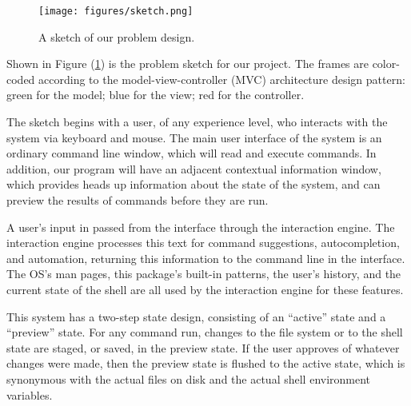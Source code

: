 \begin{figure}[h]
  \centering
  \texttt{[image: figures/sketch.png]}
  \caption{A sketch of our problem design.}
  \label{fig:sketch}
\end{figure}

Shown in Figure (\ref{fig:sketch}) is the problem sketch for our project. The
frames are color-coded according to the model-view-controller (MVC) architecture
design pattern: green for the model; blue for the view; red for the controller.

The sketch begins with a user, of any experience level, who interacts with the
system via keyboard and mouse. The main user interface of the system is an
ordinary command line window, which will read and execute commands. In addition,
our program will have an adjacent contextual information window, which provides
heads up information about the state of the system, and can preview the results
of commands before they are run.

A user's input in passed from the interface through the interaction engine. The
interaction engine processes this text for command suggestions, autocompletion,
and automation, returning this information to the command line in the interface.
The OS's man pages, this package's built-in patterns, the user's history, and
the current state of the shell are all used by the interaction engine for these
features.

This system has a two-step state design, consisting of an ``active'' state and a
``preview'' state. For any command run, changes to the file system or to the
shell state are staged, or saved, in the preview state. If the user approves of
whatever changes were made, then the preview state is flushed to the active
state, which is synonymous with the actual files on disk and the actual shell
environment variables.
